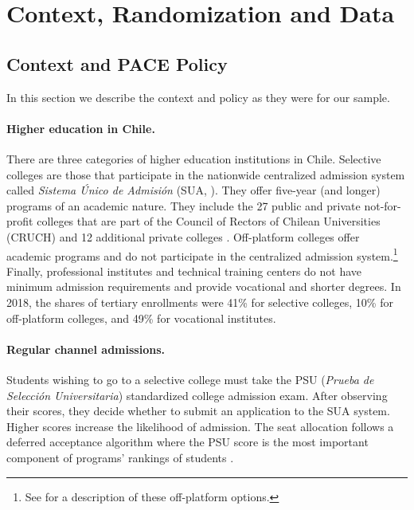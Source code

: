 \section{Context, Randomization and Data}\label{sec:background}

\subsection{Context and PACE Policy}\label{sec:regular}
\vspace{-5pt}
In this section we describe the context and policy as they were for our sample.
\vspace{-5pt}
\paragraph{Higher education in Chile.} There are three categories of higher education institutions in Chile. Selective colleges are those that participate in the nationwide centralized admission system called {\itshape Sistema \'{U}nico de Admisi\'{o}n} (SUA, \cite{mineduc_sua_universities}). They offer five-year (and longer) programs of an academic nature. They include the 27 public and private not-for-profit colleges that are part of the Council of Rectors of Chilean Universities (CRUCH) and 12 additional private colleges \citep{mineduc_sua_universities}. Off-platform colleges offer academic programs and do not participate in the centralized admission system.\footnote{See \citealp{kapor2024aftermarket} for a description of these off-platform options.}  Finally, professional institutes and technical training centers do not have minimum admission requirements and provide vocational and shorter degrees. In 2018, the shares of tertiary enrollments were 41\% for selective colleges, 10\% for off-platform colleges, and 49\% for vocational institutes.\par
\vspace{-5pt}
\paragraph{Regular channel admissions.} Students wishing to go to a selective college must take the PSU ({\itshape Prueba de Selecci\'{o}n Universitaria}) standardized college admission exam. After observing their scores, they decide whether to submit an application to the SUA system. Higher scores increase the likelihood of admission. The seat allocation follows a deferred acceptance algorithm where the PSU score is the most important component of programs' rankings of students \citep{demre2018proceso,rios2021improving,kapor2024aftermarket}. \par 




